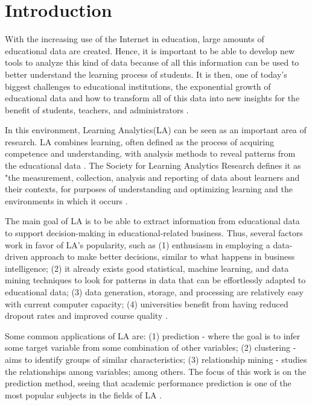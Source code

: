 \chapter{Introduction}
\label{ch:Introduction}

With the increasing use of the Internet in education, large amounts of educational data are created. Hence, it is important to be able to develop new tools to analyze this kind of data because of all this information can be used to better understand the learning process of students. It is then, one of today's biggest challenges to educational institutions, the exponential growth of educational data and how to transform all of this data into new insights for the benefit of students, teachers, and administrators \cite{romero2020educational}.

In this environment, Learning Analytics(LA) can be seen as an important area of research. LA combines learning, often defined as the process of acquiring competence and understanding, with analysis methods to reveal patterns from the educational data \cite{khalil2015learning}. The Society for Learning Analytics Research defines it as "the measurement, collection, analysis and reporting of data about learners and their contexts, for purposes of understanding and optimizing learning and the environments in which it occurs \cite{solar11}.

The main goal of LA is to be able to extract information from educational data to support decision-making in educational-related business. Thus, several factors work in favor of LA's popularity, such as (1) enthusiasm in employing a data-driven approach to make better decisions, similar to what happens in business intelligence; (2) it already exists good statistical, machine learning, and data mining techniques to look for patterns in data that can be effortlessly adapted to educational data; (3) data generation, storage, and processing are relatively easy with current computer capacity; (4) universities benefit from having reduced dropout rates and improved course quality \cite{linan2015educational}. 

Some common applications of LA are: (1) prediction - where the goal is to infer some target variable from some combination of other variables; (2) clustering - aims to identify groups of similar characteristics; (3) relationship mining - studies the relationships among variables; among others. The focus of this work is on the prediction method, seeing that academic performance prediction is one of the most popular subjects in the fields of LA \cite{akccapinar2019using}.

